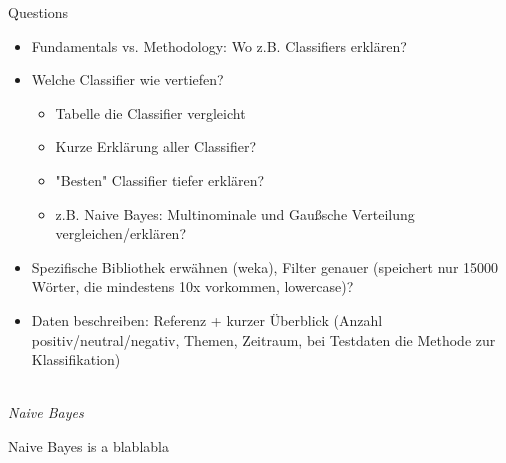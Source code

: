 Questions
\begin{itemize}
    \item Fundamentals vs. Methodology: Wo z.B. Classifiers erklären?
    \item Welche Classifier wie vertiefen?
    \begin{itemize}
    \item Tabelle die Classifier vergleicht
    \item Kurze Erklärung aller Classifier?
    \item "Besten" Classifier tiefer erklären?
    \item z.B. Naive Bayes: Multinominale und Gaußsche Verteilung vergleichen/erklären?
    \end{itemize}
    \item Spezifische Bibliothek erwähnen (weka), Filter genauer (speichert nur 15000 Wörter, die mindestens 10x vorkommen, lowercase)?
    \item Daten beschreiben: Referenz + kurzer Überblick (Anzahl positiv/neutral/negativ, Themen, Zeitraum, bei Testdaten die Methode zur Klassifikation)
\end{itemize}
\ \\

\emph{Naive Bayes}

Naive Bayes is a blablabla \cite{DBLP:books/aw/TanSKK2019}






